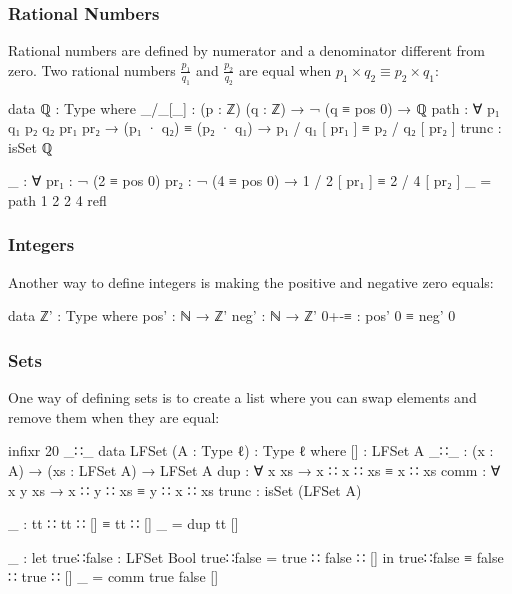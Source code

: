 \documentclass{beamer}
\begin{document}
\begin{frame}
  \frametitle{Rational Numbers}
  Rational numbers are defined by numerator and a denominator different from zero.
  Two rational numbers $ \frac{p_1}{q_1} $ and $ \frac{p_2}{q_2} $ are equal when $ p_1 \times q_2 \equiv p_2 \times q_1 $:
  \begin{code}
  data ℚ : Type where
    _/_[_] : (p : ℤ) (q : ℤ) → ¬ (q ≡ pos 0) → ℚ
    path : ∀ p₁ q₁ p₂ q₂ {pr₁ pr₂} → (p₁ · q₂) ≡ (p₂ · q₁)
      → p₁ / q₁ [ pr₁ ] ≡ p₂ / q₂ [ pr₂ ]
    trunc : isSet ℚ

  _ : ∀ {pr₁ : ¬ (2 ≡ pos 0)} {pr₂ : ¬ (4 ≡ pos 0)}
    → 1 / 2 [ pr₁ ] ≡ 2 / 4 [ pr₂ ]
  _ = path 1 2 2 4 refl
  \end{code}
\end{frame}

\begin{frame}
  \frametitle{Integers}
  Another way to define integers is making the positive and negative zero equals:
  \begin{code}
  data ℤ' : Type where
    pos' : ℕ → ℤ'
    neg' : ℕ → ℤ'
    0+-≡ : pos' 0 ≡ neg' 0
  \end{code}
\end{frame}

\begin{frame}
  \frametitle{Sets}
  One way of defining sets is to create a list where you can swap elements and remove them when they are equal:
  \begin{code}
  infixr 20 _∷_
  data LFSet (A : Type ℓ) : Type ℓ where
    []    : LFSet A
    _∷_   : (x : A) → (xs : LFSet A) → LFSet A
    dup   : ∀ x xs   → x ∷ x ∷ xs ≡ x ∷ xs
    comm  : ∀ x y xs → x ∷ y ∷ xs ≡ y ∷ x ∷ xs
    trunc : isSet (LFSet A)

  _ : tt ∷ tt ∷ [] ≡ tt ∷ []
  _ = dup tt []

  _ : let true∷false : LFSet Bool
          true∷false = true ∷ false ∷ []
      in true∷false ≡ false ∷ true ∷ []
  _ = comm true false []
  \end{code}
\end{frame}
\end{document}

